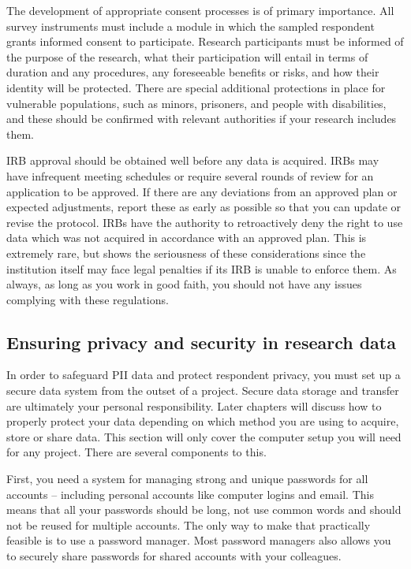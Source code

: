The development of appropriate consent processes is of primary importance.
All survey instruments must include a module in which the sampled respondent grants informed consent to participate.
Research participants must be informed of the purpose of the research,
what their participation will entail in terms of duration and any procedures,
any foreseeable benefits or risks,
and how their identity will be protected.
There are special additional protections in place for vulnerable populations,
such as minors, prisoners, and people with disabilities,
and these should be confirmed with relevant authorities if your research includes them.

IRB approval should be obtained well before any data is acquired.
IRBs may have infrequent meeting schedules
or require several rounds of review for an application to be approved.
If there are any deviations from an approved plan or expected adjustments,
report these as early as possible so that you can update or revise the protocol.
IRBs have the authority to retroactively deny
the right to use data which was not acquired in accordance with an approved plan.
This is extremely rare, but shows the seriousness of these considerations
since the institution itself may face legal penalties if its IRB
is unable to enforce them. As always, as long as you work in good faith,
you should not have any issues complying with these regulations.

\subsection{Ensuring privacy and security in research data}

In order to safeguard PII data and protect respondent privacy,
you must set up a secure data system from the outset of a project.
Secure data storage and transfer are ultimately your personal responsibility.
Later chapters will discuss how to properly protect your data depending on
which method you are using to acquire, store or share data.
This section will only cover the computer setup you will need for any project.
There are several components to this.

First, you need a system for managing strong and unique passwords for
all accounts -- including personal accounts like computer logins and email.
This means that all your passwords should be long,
not use common words and should not be reused for multiple accounts.
The only way to make that practically feasible is to use a password manager.
Most password managers also allows you to securely share passwords
for shared accounts with your colleagues.


